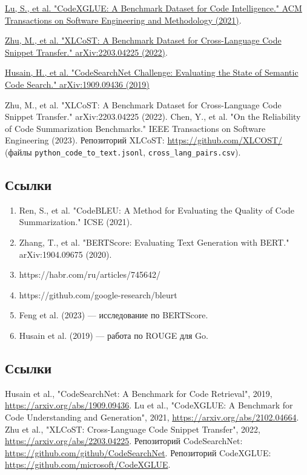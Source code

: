 \href{https://dl.acm.org/doi/10.1145/3484577}{Lu, S., et al. "CodeXGLUE: A Benchmark Dataset for Code Intelligence." ACM Transactions on Software Engineering and Methodology (2021)}.


\href{https://arxiv.org/abs/2203.04225}{Zhu, M., et al. "XLCoST: A Benchmark Dataset for Cross-Language Code Snippet Transfer." arXiv:2203.04225 (2022)}.


\href{https://arxiv.org/abs/1909.09436}{Husain, H., et al. "CodeSearchNet Challenge: Evaluating the State of Semantic Code Search." arXiv:1909.09436 (2019)}


\begin{thebibliography}{9}
     Zhu, M., et al. "XLCoST: A Benchmark Dataset for Cross-Language Code Snippet Transfer." arXiv:2203.04225 (2022).
     Chen, Y., et al. "On the Reliability of Code Summarization Benchmarks." IEEE Transactions on Software Engineering (2023).
     Репозиторий XLCoST: \url{https://github.com/XLCOST/} (файлы \texttt{python\_code\_to\_text.jsonl}, \texttt{cross\_lang\_pairs.csv}).
    \end{thebibliography}

    \subsection{Ссылки}
    \begin{enumerate}
        \item Ren, S., et al. "CodeBLEU: A Method for Evaluating the Quality of Code Summarization." ICSE (2021).
        \item Zhang, T., et al. "BERTScore: Evaluating Text Generation with BERT." arXiv:1904.09675 (2020).
        \item https://habr.com/ru/articles/745642/
        \item https://github.com/google-research/bleurt
        \item Feng et al. (2023) — исследование по BERTScore.
        \item Husain et al. (2019) — работа по ROUGE для Go.
    \end{enumerate}

    \subsection{Ссылки}
\begin{thebibliography}{9}
 Husain et al., "CodeSearchNet: A Benchmark for Code Retrieval", 2019, \url{https://arxiv.org/abs/1909.09436}.
 Lu et al., "CodeXGLUE: A Benchmark for Code Understanding and Generation", 2021, \url{https://arxiv.org/abs/2102.04664}.
 Zhu et al., "XLCoST: Cross-Language Code Snippet Transfer", 2022, \url{https://arxiv.org/abs/2203.04225}.
 Репозиторий CodeSearchNet: \url{https://github.com/github/CodeSearchNet}.
 Репозиторий CodeXGLUE: \url{https://github.com/microsoft/CodeXGLUE}.
\end{thebibliography}
